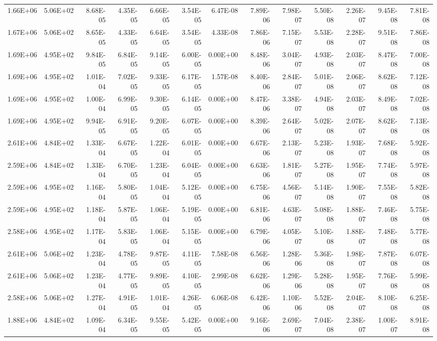 \begin{tabular}{rrrrrrrrrrrrr}
1.66E+06 & 5.06E+02 & 8.68E-05 & 4.35E-05 & 6.66E-05 & 3.54E-05 & 6.47E-08 & 7.89E-06 & 7.98E-07 & 5.50E-08 & 2.26E-07 & 9.45E-08 & 7.81E-08 \\
1.67E+06 & 5.06E+02 & 8.65E-05 & 4.33E-05 & 6.64E-05 & 3.54E-05 & 4.33E-08 & 7.86E-06 & 7.15E-07 & 5.53E-08 & 2.28E-07 & 9.51E-08 & 7.86E-08 \\
1.69E+06 & 4.95E+02 & 9.84E-05 & 6.84E-05 & 9.14E-05 & 6.00E-05 & 0.00E+00 & 8.48E-06 & 3.04E-07 & 4.93E-08 & 2.03E-07 & 8.47E-08 & 7.00E-08 \\
1.69E+06 & 4.95E+02 & 1.01E-04 & 7.02E-05 & 9.33E-05 & 6.17E-05 & 1.57E-08 & 8.40E-06 & 2.84E-07 & 5.01E-08 & 2.06E-07 & 8.62E-08 & 7.12E-08 \\
1.69E+06 & 4.95E+02 & 1.00E-04 & 6.99E-05 & 9.30E-05 & 6.14E-05 & 0.00E+00 & 8.47E-06 & 3.38E-07 & 4.94E-08 & 2.03E-07 & 8.49E-08 & 7.02E-08 \\
1.69E+06 & 4.95E+02 & 9.94E-05 & 6.91E-05 & 9.20E-05 & 6.07E-05 & 0.00E+00 & 8.39E-06 & 2.64E-07 & 5.02E-08 & 2.07E-07 & 8.62E-08 & 7.13E-08 \\
2.61E+06 & 4.84E+02 & 1.33E-04 & 6.67E-05 & 1.22E-04 & 6.01E-05 & 0.00E+00 & 6.67E-06 & 2.13E-07 & 5.23E-08 & 1.93E-07 & 7.68E-08 & 5.92E-08 \\
2.59E+06 & 4.84E+02 & 1.33E-04 & 6.70E-05 & 1.23E-04 & 6.04E-05 & 0.00E+00 & 6.63E-06 & 1.81E-07 & 5.27E-08 & 1.95E-07 & 7.74E-08 & 5.97E-08 \\
2.59E+06 & 4.95E+02 & 1.16E-04 & 5.80E-05 & 1.04E-04 & 5.12E-05 & 0.00E+00 & 6.75E-06 & 4.56E-07 & 5.14E-08 & 1.90E-07 & 7.55E-08 & 5.82E-08 \\
2.59E+06 & 4.95E+02 & 1.18E-04 & 5.87E-05 & 1.06E-04 & 5.19E-05 & 0.00E+00 & 6.81E-06 & 4.63E-07 & 5.08E-08 & 1.88E-07 & 7.46E-08 & 5.75E-08 \\
2.58E+06 & 4.95E+02 & 1.17E-04 & 5.83E-05 & 1.06E-04 & 5.15E-05 & 0.00E+00 & 6.79E-06 & 4.05E-07 & 5.10E-08 & 1.88E-07 & 7.48E-08 & 5.77E-08 \\
2.61E+06 & 5.06E+02 & 1.23E-04 & 4.78E-05 & 9.87E-05 & 4.11E-05 & 7.58E-08 & 6.56E-06 & 1.28E-06 & 5.36E-08 & 1.98E-07 & 7.87E-08 & 6.07E-08 \\
2.61E+06 & 5.06E+02 & 1.23E-04 & 4.77E-05 & 9.89E-05 & 4.10E-05 & 2.99E-08 & 6.62E-06 & 1.29E-06 & 5.28E-08 & 1.95E-07 & 7.76E-08 & 5.99E-08 \\
2.58E+06 & 5.06E+02 & 1.27E-04 & 4.91E-05 & 1.01E-04 & 4.26E-05 & 6.06E-08 & 6.42E-06 & 1.10E-06 & 5.52E-08 & 2.04E-07 & 8.10E-08 & 6.25E-08 \\
1.88E+06 & 4.84E+02 & 1.09E-04 & 6.34E-05 & 9.55E-05 & 5.42E-05 & 0.00E+00 & 9.16E-06 & 2.69E-07 & 7.04E-08 & 2.38E-07 & 1.00E-07 & 8.91E-08 \\

\end{tabular}
